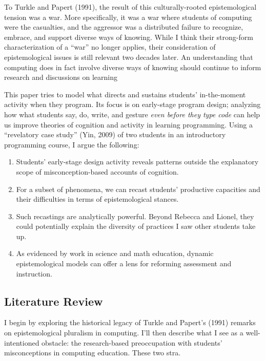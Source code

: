 To Turkle and Papert (1991), the result of this culturally-rooted
epistemological tension was a war. More specifically, it was a war where
students of computing were the casualties, and the aggressor was a
distributed failure to recognize, embrace, and support diverse ways of
knowing. While I think their strong-form characterization of a ``war''
no longer applies, their consideration of epistemological issues is
still relevant two decades later. An understanding that computing does
in fact involve diverse ways of knowing should continue to inform
research and discussions on learning

This paper tries to model what directs and sustains students'
in-the-moment activity when they program. Its focus is on early-stage
program design; analyzing how what students say, do, write, and gesture
\emph{even before they type code} can help us improve theories of
cognition and activity in learning programming. Using a ``revelatory
case study'' (Yin, 2009) of two students in an introductory programming
course, I argue the following:

\begin{enumerate}
\def\labelenumi{\arabic{enumi}.}
\item
  Students' early-stage design activity reveals patterns outside the
  explanatory scope of misconception-based accounts of cognition.
\item
  For a subset of phenomena, we can recast students' productive
  capacities and their difficulties in terms of epistemological stances.
\item
  Such recastings are analytically powerful. Beyond Rebecca and Lionel,
  they could potentially explain the diversity of practices I saw other
  students take up.
\item
  As evidenced by work in science and math education, dynamic
  epistemological models can offer a lens for reforming assessment and
  instruction.
\end{enumerate}

\subsection{Literature Review}\label{literature-review}

I begin by exploring the historical legacy of Turkle and Papert's (1991)
remarks on epistemological pluralism in computing. I'll then describe
what I see as a well-intentioned obstacle: the research-based
preoccupation with students' misconceptions in computing education.
These two stra.


